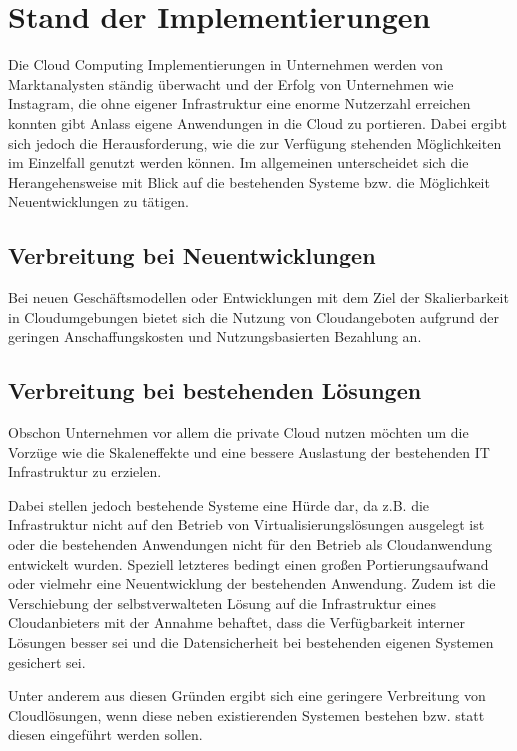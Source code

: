 \section{Stand der Implementierungen}
\label{sec_implementations}
Die Cloud Computing Implementierungen in Unternehmen werden von Marktanalysten ständig überwacht und der Erfolg von Unternehmen wie Instagram, die ohne eigener Infrastruktur eine enorme Nutzerzahl erreichen konnten gibt Anlass eigene Anwendungen in die Cloud zu portieren. Dabei ergibt sich jedoch die Herausforderung, wie die zur Verfügung stehenden Möglichkeiten im Einzelfall genutzt werden können. Im allgemeinen unterscheidet sich die Herangehensweise mit Blick auf die bestehenden Systeme bzw. die Möglichkeit Neuentwicklungen zu tätigen.

\subsection{Verbreitung bei Neuentwicklungen}
Bei neuen Geschäftsmodellen oder Entwicklungen mit dem Ziel der Skalierbarkeit in Cloudumgebungen bietet sich die Nutzung von Cloudangeboten aufgrund der geringen Anschaffungskosten und Nutzungsbasierten Bezahlung an. \cite{gigaOm}

\subsection{Verbreitung bei bestehenden Lösungen}
Obschon Unternehmen vor allem die private Cloud nutzen möchten um die Vorzüge wie die Skaleneffekte und eine bessere Auslastung der bestehenden IT Infrastruktur zu erzielen. 

Dabei stellen jedoch bestehende Systeme eine Hürde dar, da z.B. die Infrastruktur nicht auf den Betrieb von Virtualisierungslösungen ausgelegt ist oder die bestehenden Anwendungen nicht für den Betrieb als Cloudanwendung entwickelt wurden. Speziell letzteres bedingt einen großen Portierungsaufwand oder vielmehr eine Neuentwicklung der bestehenden Anwendung. Zudem ist die Verschiebung der selbstverwalteten Lösung auf die Infrastruktur eines Cloudanbieters mit der Annahme behaftet, dass die Verfügbarkeit interner Lösungen besser sei und die Datensicherheit bei bestehenden eigenen Systemen gesichert sei. \cite{gigaom}

Unter anderem aus diesen Gründen ergibt sich eine geringere Verbreitung von Cloudlösungen, wenn diese neben existierenden Systemen bestehen bzw. statt diesen eingeführt werden sollen.

